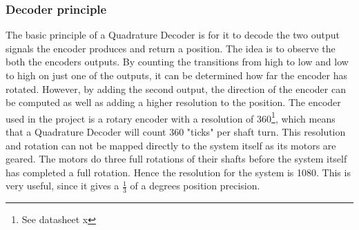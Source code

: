 \documentclass[../../../main]{subfiles}
\begin{document}
\subsubsection{Decoder principle}
The basic principle of a Quadrature Decoder is for it to decode the two output signals the encoder produces and return a position. The idea is to observe the both the encoders outputs. By counting the transitions from high to low and low to high on just one of the outputs, it can be determined how far the encoder has rotated. However, by adding the second output, the direction of the encoder can be computed as well as adding a higher resolution to the position. The encoder used in the project is a rotary encoder with a resolution of 360\footnote{See datasheet x}, which means that a Quadrature Decoder will count 360 "ticks" per shaft turn. This resolution and rotation can not be mapped directly to the system itself as its motors are geared. The motors do three full rotations of their shafts before the system itself has completed a full rotation. Hence the resolution for the system is 1080. This is very useful, since it gives a $\frac{1}{3}$ of a degrees position precision.
\end{document}
